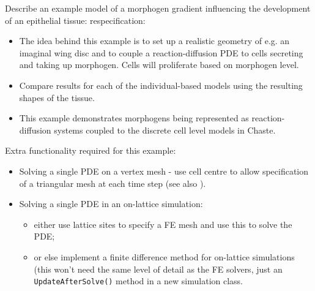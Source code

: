 \documentclass{article}
\begin{document}
\noindent Describe an example model of a morphogen gradient influencing the development of an epithelial tissue: respecification:
\begin{itemize}
\item The idea behind this example is to set up a realistic geometry of e.g. an imaginal wing disc and to couple a reaction-diffusion PDE to cells secreting and taking up morphogen. Cells will proliferate based on morphogen level.
\item Compare results for each of the individual-based models using the resulting shapes of the tissue.
\item This example demonstrates morphogens being represented as reaction-diffusion systems coupled to the discrete cell level models in Chaste.
\end{itemize}

\noindent Extra functionality required for this example:
\begin{itemize}
\item Solving a single PDE on a vertex mesh - use cell centre to allow specification of a triangular mesh at each time step (see also \citet{Smith2011Incorporating}).
\item Solving a single PDE in an on-lattice simulation:
\begin{itemize}
\item either use lattice sites to specify a FE mesh and use this to solve the PDE;
\item or else implement a finite difference method for on-lattice simulations (this won't need the same level of detail as the FE solvers, just an \texttt{UpdateAfterSolve()} method in a new simulation class.
\end{itemize}
\end{itemize}
\end{document}
